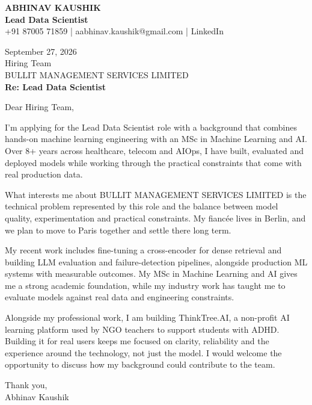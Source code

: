 \documentclass[10pt,a4paper]{article}
\begin{document}
\begin{center}
{\Large\bfseries ABHINAV KAUSHIK}\\[2pt]
{\bfseries Lead Data Scientist}\\[2pt]
+91 87005 71859 \quad | \quad aabhinav.kaushik@gmail.com \quad | \quad LinkedIn
\end{center}
\vspace{8pt}
September 27, 2026\\[6pt]
Hiring Team\\
BULLIT MANAGEMENT SERVICES LIMITED\\[4pt]
\textbf{Re: Lead Data Scientist}

Dear Hiring Team,

I’m applying for the Lead Data Scientist role with a background that combines hands-on machine learning engineering with an MSc in Machine Learning and AI. Over 8+ years across healthcare, telecom and AIOps, I have built, evaluated and deployed models while working through the practical constraints that come with real production data.

What interests me about BULLIT MANAGEMENT SERVICES LIMITED is the technical problem represented by this role and the balance between model quality, experimentation and practical constraints. My fiancée lives in Berlin, and we plan to move to Paris together and settle there long term.

My recent work includes fine-tuning a cross-encoder for dense retrieval and building LLM evaluation and failure-detection pipelines, alongside production ML systems with measurable outcomes. My MSc in Machine Learning and AI gives me a strong academic foundation, while my industry work has taught me to evaluate models against real data and engineering constraints.

Alongside my professional work, I am building ThinkTree.AI, a non-profit AI learning platform used by NGO teachers to support students with ADHD. Building it for real users keeps me focused on clarity, reliability and the experience around the technology, not just the model. I would welcome the opportunity to discuss how my background could contribute to the team.

Thank you,\\
Abhinav Kaushik
\end{document}
